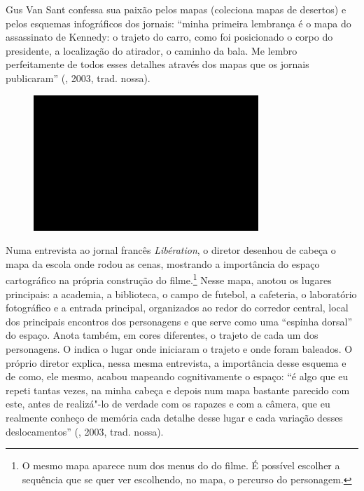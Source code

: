 Gus Van Sant confessa sua paixão pelos mapas (coleciona mapas de
desertos) e pelos esquemas infográficos dos jornais: ``minha primeira
lembrança é o mapa do assassinato de Kennedy: o trajeto do carro, como
foi posicionado o corpo do presidente, a localização do atirador, o
caminho da bala. Me lembro perfeitamente de todos esses detalhes através
dos mapas que os jornais publicaram'' (, 2003, trad. nossa).

\begin{figure}[!ht]
\centering
 \includegraphics[width=85mm]{./imgs/im1.jpg}
\caption{\tiny{}}
\end{figure}


Numa entrevista ao jornal francês \emph{Libération}, o diretor desenhou
de cabeça o mapa da escola onde rodou as cenas, mostrando a importância
do espaço cartográfico na própria construção do filme.\footnote{O mesmo
  mapa aparece num dos menus do  do filme. É possível escolher a
  sequência que se quer ver escolhendo, no mapa, o percurso do
  personagem.} Nesse mapa, anotou os lugares principais: a academia, a
biblioteca, o campo de futebol, a cafeteria, o laboratório fotográfico e
a entrada principal, organizados ao redor do corredor central, local dos
principais encontros dos personagens e que serve como uma ``espinha
dorsal'' do espaço. Anota também, em cores diferentes, o trajeto de cada
um dos personagens. O  indica o lugar onde iniciaram o trajeto e onde
foram baleados. O próprio diretor explica, nessa mesma entrevista, a
importância desse esquema e de como, ele mesmo, acabou mapeando
cognitivamente o espaço: ``é algo que eu repeti tantas vezes, na minha
cabeça e depois num mapa bastante parecido com este, antes de realizá"-lo
de verdade com os rapazes e com a câmera, que eu realmente conheço de
memória cada detalhe desse lugar e cada variação desses deslocamentos''
(, 2003, trad. nossa).

